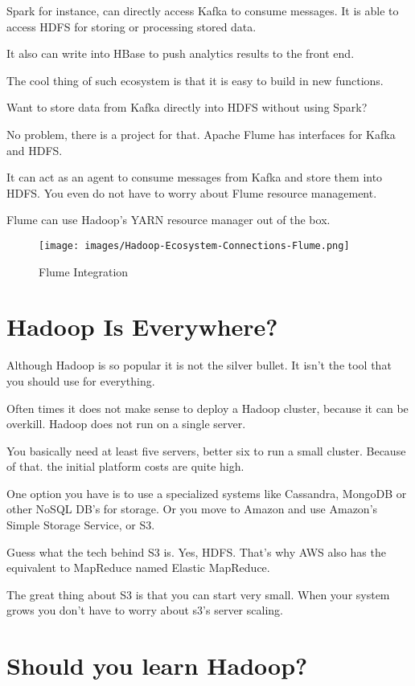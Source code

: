 \documentclass[12pt, numbers=noenddot]{scrreprt} %
\begin{document}
Spark for instance, can directly access Kafka to consume messages. It is able to access HDFS for storing or processing stored data.

It also can write into HBase to push analytics results to the front end.


The cool thing of such ecosystem is that it is easy to build in new functions.

Want to store data from Kafka directly into HDFS without using Spark?

No problem, there is a project for that. Apache Flume has interfaces for Kafka and HDFS.

It can act as an agent to consume messages from Kafka and store them into HDFS. You even do not have to worry about Flume resource management.

Flume can use Hadoop’s YARN resource manager out of the box.

\begin{figure}[htbp]
  \centering
     \texttt{[image: images/Hadoop-Ecosystem-Connections-Flume.png]}
  \caption{Flume Integration}
  \label{fig:Bild1}
\end{figure}



\section{Hadoop Is Everywhere?}

Although Hadoop is so popular it is not the silver bullet. It isn’t the tool that you should use for everything.

Often times it does not make sense to deploy a Hadoop cluster, because it can be overkill. Hadoop does not run on a single server.

You basically need at least five servers, better six to run a small cluster. Because of that. the initial platform costs are quite high.

One option you have is to use a specialized systems like Cassandra, MongoDB or other NoSQL DB’s for storage. Or you move to Amazon and use Amazon’s Simple Storage Service, or S3.

Guess what the tech behind S3 is. Yes, HDFS. That’s why AWS also has the equivalent to MapReduce named Elastic MapReduce.

The great thing about S3 is that you can start very small. When your system grows you don’t have to worry about s3’s server scaling.

\section{Should you learn Hadoop? }
\end{document}
